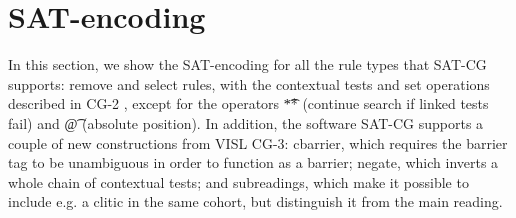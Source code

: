 \def\sobre{\text{\em sobre}}
\def\una{\text{\em una}}
\def\aproximacion{\text{ \em aproximaci\'{o}n}}
\def\mas{\text{\em m\'{a}s}}
\def\cientifica{\text{\em cient\'{\i}fica}}


\def\vPrsPThree{\text{\sc PrsP3}}
\def\vPrsPOne{\text{\sc PrsP1}}
\def\vImpPThree{\text{\sc ImpP3}}
\def\adj{{\text{\sc Adj}}}
\def\adv{{\text{\sc Adv}}}
\def\n{\text{\sc N}}
\def\pr{{\text{\sc Pr}}}
\def\prn{{\text{\sc Prn}}}
\def\det{{\text{\sc Det}}}
\def\notDet{{\neg \text{\sc Det}}}
\def\any{{\text{Any}}}


\def\sobrePr{\sobre_\pr}
\def\sobreN{\sobre_\n}

\def\unaNotDet{\una_\notDet}
\def\unaAny{\una_\any}
\def\unaPrn{\una_\prn}
\def\unaDet{\una_\det}
\def\unaPrsPThree{\una_\vPrsPThree}
\def\unaPrsPOne{\una_\vPrsPOne}
\def\unaImp{\una_\vImpPThree}
\def\aproximacionN{\aproximacion_\n}
\def\masAdv{\mas_\adv}
\def\masAdj{\mas_\adj}
\def\cientificaAdj{\cientifica_\adj}
\def\cientificaN{\cientifica_\n}


\def\newVar{\text{}} %

\def\cgrule#1{\noindent {\bf  #1 }}
\def\eqdef{\Coloneqq}
\def\impl{\quad\Longrightarrow\quad}

\def\ob#1{\overbrace{ #1 \rule{0pt}{2ex}}}





\section{SAT-encoding}


\noindent In this section, we show the SAT-encoding for all the rule types that 
SAT-CG supports: 
{\sc remove} and {\sc select} rules, with the contextual tests and set operations described in CG-2 \cite{tapanainen1996}, except for the operators \t{**} (continue search if linked tests fail) and \t{@} (absolute position). In addition, the software SAT-CG supports a couple of new constructions from VISL CG-3: {\sc cbarrier}, which requires the barrier tag to be unambiguous in order to function as a barrier;
{\sc negate}, which inverts a whole chain of contextual tests; and subreadings, which make it possible to include e.g. a clitic in the same cohort, but distinguish it from the main reading.

